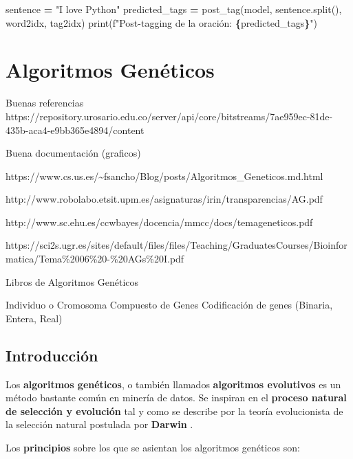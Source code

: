 \documentclass[
  a4paper,
  DIV=11,
  numbers=noendperiod]{scrreprt}
\newenvironment{Shaded}{\begin{snugshade}}{\end{snugshade}}
\newcommand{\BuiltInTok}[1]{#1}
\newcommand{\NormalTok}[1]{#1}
\newcommand{\OperatorTok}[1]{\textcolor[rgb]{0.81,0.36,0.00}{\textbf{#1}}}
\newcommand{\SpecialCharTok}[1]{\textcolor[rgb]{0.81,0.36,0.00}{\textbf{#1}}}
\newcommand{\SpecialStringTok}[1]{\textcolor[rgb]{0.31,0.60,0.02}{#1}}
\newcommand{\StringTok}[1]{\textcolor[rgb]{0.31,0.60,0.02}{#1}}
\begin{document}
\begin{Shaded}
\begin{Highlighting}[numbers=left,,]
\NormalTok{sentence }\OperatorTok{=} \StringTok{"I love Python"}
\NormalTok{predicted\_tags }\OperatorTok{=}\NormalTok{ post\_tag(model, sentence.split(), word2idx, tag2idx)}
\BuiltInTok{print}\NormalTok{(}\SpecialStringTok{f"Post{-}tagging de la oración: }\SpecialCharTok{\{}\NormalTok{predicted\_tags}\SpecialCharTok{\}}\SpecialStringTok{"}\NormalTok{)}
\end{Highlighting}
\end{Shaded}


\chapter{Algoritmos Genéticos}\label{algoritmos-genuxe9ticos}

Buenas referencias
https://repository.urosario.edu.co/server/api/core/bitstreams/7ae959ec-81de-435b-aca4-e9bb365e4894/content

Buena documentación (graficos)

https://www.cs.us.es/\textasciitilde fsancho/Blog/posts/Algoritmos\_Geneticos.md.html

http://www.robolabo.etsit.upm.es/asignaturas/irin/transparencias/AG.pdf

http://www.sc.ehu.es/ccwbayes/docencia/mmcc/docs/temageneticos.pdf

https://sci2s.ugr.es/sites/default/files/files/Teaching/GraduatesCourses/Bioinformatica/Tema\%2006\%20-\%20AGs\%20I.pdf

Libros de Algoritmos Genéticos

Individuo o Cromosoma Compuesto de Genes Codificación de genes (Binaria,
Entera, Real)

\section{Introducción}\label{introducciuxf3n-4}

Los \textbf{algoritmos genéticos}, o también llamados \textbf{algoritmos
evolutivos} es un método bastante común en minería de datos. Se inspiran
en el \textbf{proceso natural de selección y evolución} tal y como se
describe por la teoría evolucionista de la selección natural postulada
por \textbf{Darwin} \autocite{darwin1859}.

Los \textbf{principios} sobre los que se asientan los algoritmos
genéticos son:
\end{document}
